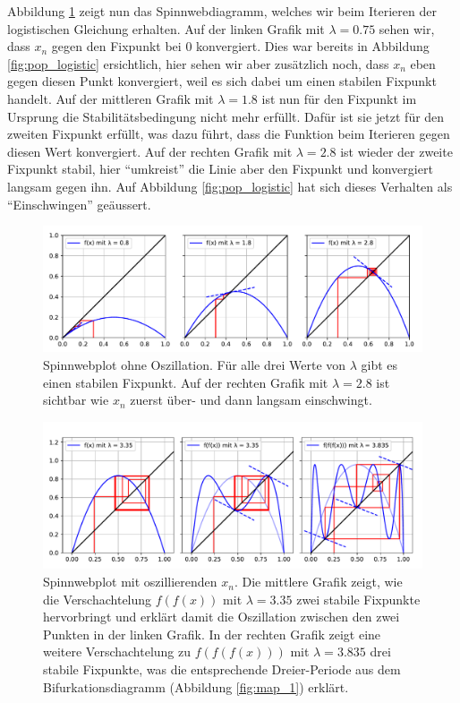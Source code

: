 Abbildung \ref{fig:web_1} zeigt nun das Spinnwebdiagramm,
welches wir beim Iterieren der logistischen Gleichung erhalten.  
Auf der linken Grafik mit $\lambda = 0.75$ sehen wir,
dass $x_n$ gegen den Fixpunkt bei $0$ konvergiert. 
Dies war bereits in Abbildung \ref{fig:pop_logistic} ersichtlich,
hier sehen wir aber zusätzlich noch, dass $x_n$ eben gegen
diesen Punkt konvergiert, weil es sich dabei um einen
stabilen Fixpunkt handelt.  
Auf der mittleren Grafik mit $\lambda = 1.8$ ist nun für den
Fixpunkt im Ursprung die Stabilitätsbedingung nicht
mehr erfüllt. 
Dafür ist sie jetzt für den zweiten Fixpunkt erfüllt, 
was dazu führt, dass die Funktion beim Iterieren gegen 
diesen Wert konvergiert.  
Auf der rechten Grafik mit $\lambda = 2.8$ ist wieder der  
zweite Fixpunkt stabil, hier ``umkreist'' die Linie aber
den Fixpunkt und konvergiert langsam gegen ihn. 
Auf Abbildung \ref{fig:pop_logistic} hat sich dieses Verhalten
als ``Einschwingen'' geäussert.
%
\begin{figure}[h!]
    \includegraphics[width=\linewidth]{papers/logistic/figures/web_1.pdf}
    \caption{
        Spinnwebplot ohne Oszillation.
        Für alle drei Werte von $\lambda$ gibt es 
        einen stabilen Fixpunkt. 
        Auf der rechten Grafik mit $\lambda = 2.8$
        ist sichtbar wie $x_n$ 
        zuerst über- und dann langsam einschwingt.
    }
    \label{fig:web_1}
\end{figure}
\begin{figure}[h!]
    \includegraphics[width=\linewidth]{papers/logistic/figures/web_2.pdf}
    \caption{
        Spinnwebplot mit oszillierenden $x_n$. 
        Die mittlere Grafik zeigt, wie 
        die Verschachtelung $f(f(x))$ mit 
        $\lambda = 3.35$ zwei
        stabile Fixpunkte hervorbringt und erklärt
        damit die Oszillation zwischen
        den zwei Punkten in der linken Grafik.
        In der rechten Grafik zeigt eine weitere 
        Verschachtelung zu $f(f(f(x)))$
        mit $\lambda = 3.835$ 
        drei stabile Fixpunkte, was
        die entsprechende Dreier-Periode aus dem 
        Bifurkationsdiagramm (Abbildung \ref{fig:map_1})
        erklärt. 
    }
    \label{fig:web_2}
\end{figure}

